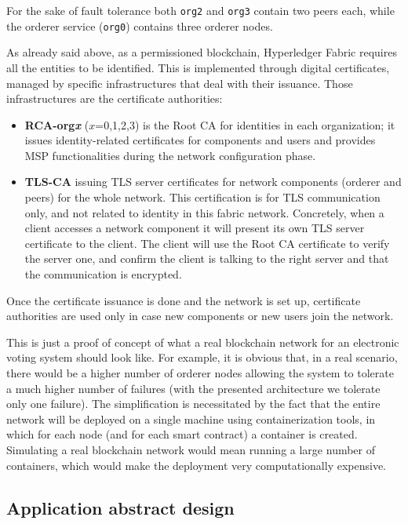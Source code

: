 \documentclass{scrartcl}
\begin{document}
For the sake of fault tolerance both \texttt{org2} and \texttt{org3} contain two peers each, while the orderer service (\texttt{org0}) contains three orderer nodes.

As already said above, as a permissioned blockchain, Hyperledger Fabric requires all the entities to be identified. This is implemented through digital certificates, managed by specific infrastructures that deal with their issuance.
Those infrastructures are the certificate authorities:

\begin{itemize}
    \item \textbf{RCA-org\emph{x}} ($x$=0,1,2,3) is the Root CA for identities in each organization; it issues identity-related certificates for components and users and provides MSP functionalities during the network configuration phase.
    \item \textbf{TLS-CA} issuing TLS server certificates for network components (orderer and peers) for the whole network. This certification is for TLS communication only, and not related to identity in this fabric network. Concretely, when a client accesses a network component it will present its own TLS server certificate to the client. The client will use the Root CA certificate to verify the server one, and confirm the client is talking to the right server and that the communication is encrypted.
\end{itemize}

Once the certificate issuance is done and the network is set up, certificate authorities are used only in case new components or new users join the network.

\begin{warn}
    This is just a proof of concept of what a real blockchain network for an electronic voting system should look like. For example, it is obvious that, in a real scenario, there would be a higher number of orderer nodes allowing the system to tolerate a much higher number of failures (with the presented architecture we tolerate only one failure). 
    The simplification is necessitated by the fact that the entire network will be deployed on a single machine using containerization tools, in which for each node (and for each smart contract) a container is created.
    Simulating a real blockchain network would mean running a large number of containers, which would make the deployment very computationally expensive.
\end{warn}

\subsection{Application abstract design}
\end{document}
